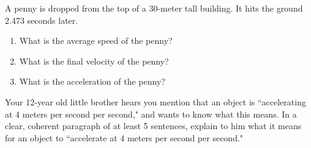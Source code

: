 \documentclass[12pt]{examdesign}
\begin{document}
\begin{shortanswer}[title={Free Response},
	rearrange=no]


\begin{question}
A penny is dropped from the top of a 30-meter tall building.  It hits the ground 2.473 seconds later.  
	\begin{enumerate}
		\item What is the average speed of the penny? 
		\vspace{1in}
	\item What is the final velocity of the penny?
	\vspace{1in}
	\item What is the acceleration of the penny?
		\vspace{1in}
\end{enumerate}
\end{question}

\begin{question}
Your 12-year old little brother hears you mention that an object is ``accelerating at 4 meters per second per second," and wants to know what this means.  In a clear, coherent paragraph of at least 5 sentences, explain to him what it means for an object to ``accelerate at 4 meters per second per second."


	\end{question}

	\end{shortanswer}
\end{document}
